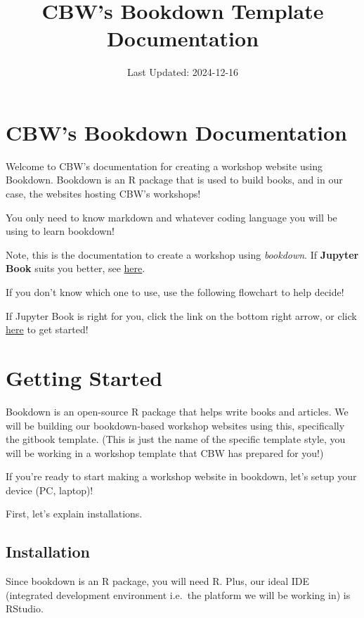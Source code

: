 \documentclass[
]{book}
\title{CBW's Bookdown Template Documentation}
\author{}
\date{\vspace{-2.5em}Last Updated: 2024-12-16}
\theoremstyle{definition}
\theoremstyle{definition}
\theoremstyle{definition}
\theoremstyle{definition}
\theoremstyle{remark}
\begin{document}
\maketitle

{
\setcounter{tocdepth}{1}
\tableofcontents
}
\chapter{CBW's Bookdown Documentation}\label{cbws-bookdown-documentation}

Welcome to CBW's documentation for creating a workshop website using Bookdown. Bookdown is an R package that is used to build books, and in our case, the websites hosting CBW's workshops!

You only need to know markdown and whatever coding language you will be using to learn bookdown!

Note, this is the documentation to create a workshop using \emph{bookdown}. If \textbf{Jupyter Book} suits you better, see \href{https://cbw-dev.github.io/jupyterbook-docs/}{here}.

If you don't know which one to use, use the following flowchart to help decide!

If Jupyter Book is right for you, click the link on the bottom right arrow, or click \hyperref[get-started]{here} to get started!

\chapter{Getting Started}\label{get-started}

Bookdown is an open-source R package that helps write books and articles. We will be building our bookdown-based workshop websites using this, specifically the gitbook template. (This is just the name of the specific template style, you will be working in a workshop template that CBW has prepared for you!)

If you're ready to start making a workshop website in bookdown, let's setup your device (PC, laptop)!

First, let's explain installations.

\section{Installation}\label{installation}

Since bookdown is an R package, you will need R. Plus, our ideal IDE (integrated development environment i.e.~the platform we will be working in) is RStudio.
\end{document}
